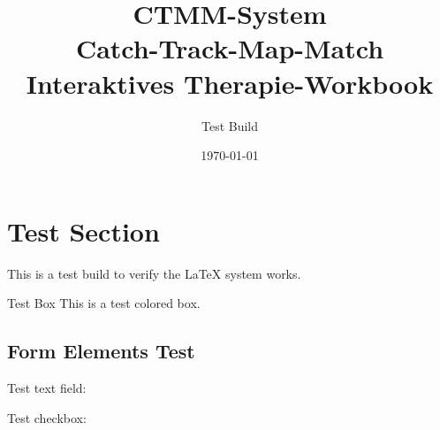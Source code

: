 \documentclass[a4paper,12pt]{article}
\begin{document}
\title{%
  {\Huge\textcolor{ctmmBlue}{CTMM-System}}\\
  \vspace{0.5cm}
  {\Large\textcolor{ctmmOrange}{Catch-Track-Map-Match}}\\
  \vspace{0.3cm}
  {\large Interaktives Therapie-Workbook}
}

\author{Test Build}
\date{\today}

\maketitle

\section{Test Section}

This is a test build to verify the LaTeX system works.

\begin{ctmmBlueBox}{Test Box}
This is a test colored box.
\end{ctmmBlueBox}

\subsection{Form Elements Test}

Test text field: 

Test checkbox: 
\end{document}
